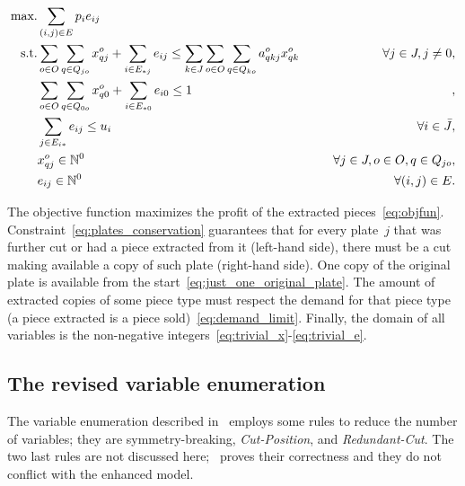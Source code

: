 \documentclass[smallextended]{svjour3}       %
\begin{document}
\begin{align}
\mbox{max.} &\sum_{(i, j) \in E} p_i e_{ij} \label{eq:objfun}\\
\mbox{s.t.} &\sum_{o \in O}\sum_{q \in Q_{jo}} x^o_{qj} + \sum_{i \in E_{*j}} e_{ij} \leq \sum_{k \in J}\sum_{o \in O}\sum_{q \in Q_{ko}} a^o_{qkj} x^o_{qk} \hspace*{0.05\textwidth} & \forall j \in J, j \neq 0,\label{eq:plates_conservation}\\
	& \sum_{o \in O}\sum_{q \in Q_{0o}} x^o_{q0} + \sum_{i \in E_{*0}} e_{i0} \leq 1 &,\label{eq:just_one_original_plate}\\
	& \sum_{j \in E_{i*}} e_{ij} \leq u_i & \forall i \in \bar{J},\label{eq:demand_limit}\\
	& x^o_{qj} \in \mathbb{N}^0 & \forall j \in J, o \in O, q \in Q_{jo},\label{eq:trivial_x}\\
	& e_{ij} \in \mathbb{N}^0 & \forall (i, j) \in E.\label{eq:trivial_e}
\end{align}

The objective function maximizes the profit of the extracted pieces~\eqref{eq:objfun}.
Constraint~\eqref{eq:plates_conservation} guarantees that for every plate~\(j\) that was further cut or had a piece extracted from it (left-hand side), there must be a cut making available a copy of such plate (right-hand side).
One copy of the original plate is available from the start~\eqref{eq:just_one_original_plate}.
The amount of extracted copies of some piece type must respect the demand for that piece type (a piece extracted is a piece sold)~\eqref{eq:demand_limit}.
Finally, the domain of all variables is the non-negative integers~\eqref{eq:trivial_x}-\eqref{eq:trivial_e}.

\subsection{The revised variable enumeration}
\label{sec:var_enum}

The variable enumeration described in~\cite{furini:2016} employs some rules to reduce the number of variables; they are symmetry-breaking, \emph{Cut-Position}, and \emph{Redundant-Cut}.
The two last rules are not discussed here; \cite{furini:2016}~proves their correctness and they do not conflict with the enhanced model.
\end{document}
